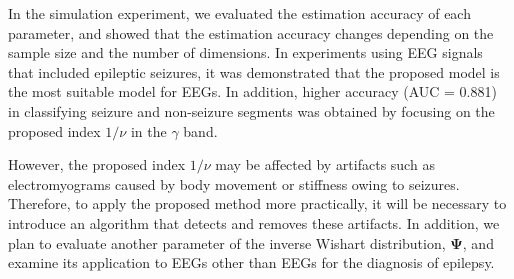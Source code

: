 \documentclass[journal]{IEEEtran}
\begin{document}
In the simulation experiment, we evaluated the estimation accuracy of each parameter, and showed that the estimation accuracy changes depending on the sample size and the number of dimensions. 
In experiments using EEG signals that included epileptic seizures, it was demonstrated that the proposed model is the most suitable model for EEGs.
In addition, higher accuracy (AUC = 0.881) in classifying seizure and non-seizure segments was obtained by focusing on the proposed index $1/\nu$ in the $\gamma$ band.

However, the proposed index $1/\nu$ may be affected by artifacts such as electromyograms caused by body movement or stiffness owing to seizures.
Therefore, to apply the proposed method more practically, it will be necessary to introduce an algorithm that detects and removes these artifacts.
In addition, we plan to evaluate another parameter of the inverse Wishart distribution, $\mathbf{\Psi}$, and examine its application to EEGs other than EEGs for the diagnosis of epilepsy.
\end{document}
